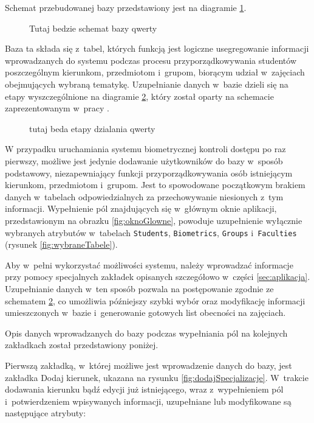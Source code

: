Schemat przebudowanej bazy przedstawiony jest na diagramie \ref{fig:bazaDanych}.

 
\begin{figure}
\begin{center}
\caption{Tutaj bedzie schemat bazy qwerty}
\label{fig:bazaDanych}
\end{center}
\end{figure}

Baza ta składa się z~tabel, których funkcją jest logiczne usegregowanie informacji wprowadzanych do systemu podczas procesu przyporządkowywania studentów poszczególnym kierunkom, przedmiotom i~grupom, biorącym udział w~zajęciach obejmujących wybraną tematykę. Uzupełnianie danych w~bazie dzieli się na etapy wyszczególnione na diagramie \ref{fig:etapyDzialania}, który został oparty na schemacie zaprezentowanym w~pracy \cite{Gl11}.

\begin{figure}
\begin{center}
\caption{tutaj beda etapy dzialania qwerty}
\label{fig:etapyDzialania}
\end{center}
\end{figure}

W przypadku uruchamiania systemu biometrycznej kontroli dostępu po raz pierwszy, możliwe jest jedynie dodawanie użytkowników do bazy w~sposób podstawowy, niezapewniający funkcji przyporządkowywania osób istniejącym kierunkom, przedmiotom i~grupom. Jest to spowodowane początkowym brakiem danych w~tabelach odpowiedzialnych za przechowywanie niesionych z~tym informacji. Wypełnienie pól znajdujących się w~głównym oknie aplikacji, przedstawionym na obrazku \ref{fig:oknoGlowne}, powoduje uzupełnienie wyłącznie wybranych atrybutów w~tabelach \verb!Students!, \verb!Biometrics!, \verb!Groups! i~\verb!Faculties! (rysunek \ref{fig:wybraneTabele}). 

Aby w~pełni wykorzystać możliwości systemu, należy wprowadzać informacje przy pomocy specjalnych zakładek opisanych szczegółowo w~części \ref{sec:aplikacja}. Uzupełnianie danych w~ten sposób pozwala na postępowanie zgodnie ze schematem \ref{fig:etapyDzialania}, co umożliwia późniejszy szybki wybór oraz modyfikację informacji umieszczonych w~bazie i~generowanie gotowych list obecności na zajęciach.

Opis danych wprowadzanych do bazy podczas wypełniania pól na kolejnych zakładkach został przedstawiony poniżej.

Pierwszą zakładką, w~której możliwe jest wprowadzenie danych do bazy, jest zakładka Dodaj kierunek, ukazana na rysunku \ref{fig:dodajSpecjalizacje}. W~trakcie dodawania kierunku bądź edycji już istniejącego, wraz z~wypełnieniem pól i~potwierdzeniem wpisywanych informacji, uzupełniane lub modyfikowane są następujące atrybuty:

